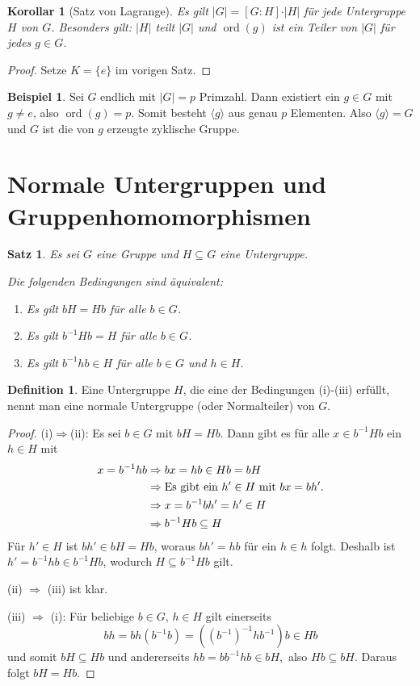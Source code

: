 \documentclass[12pt]{scrartcl} %
\DeclareMathOperator{\ord}{ord}
\newtheorem{thm}{Satz}
\newtheorem{kor}{Korollar}
\theoremstyle{definition}
\newtheorem*{defn}{Definition}
\newtheorem{ex}{Beispiel}
\theoremstyle{remark}
\begin{document}
\begin{kor}[Satz von Lagrange]
	Es gilt $\vert G\vert = [G:H]\cdot\vert H\vert$ für jede Untergruppe $H$ von $G$.
	Besonders gilt: $\vert H\vert$ teilt $\vert G\vert$ und $\ord(g)$ ist ein Teiler von $\vert G\vert$ für jedes $g\in G$.
\end{kor}

\begin{proof}
	Setze $K = \{e\}$ im vorigen Satz.
\end{proof}

\begin{ex}
	Sei $G$ endlich mit $\vert G\vert=p$ Primzahl.
	Dann existiert ein $g \in G$ mit $g \neq e$, also $\ord(g)=p$.
	Somit besteht $\langle g\rangle$ aus genau $p$ Elementen.
	Also $\langle g\rangle=G$ und $G$ ist die von $g$ erzeugte zyklische Gruppe.
\end{ex}

\section{Normale Untergruppen und Gruppenhomomorphismen}

\begin{thm}
	Es sei $G$ eine Gruppe und $H\subseteq G$ eine Untergruppe.

	Die folgenden Bedingungen sind äquivalent:
	\begin{enumerate}[label=(\roman*)]
	\item Es gilt $bH=Hb$ für alle $b\in G$.
	\item Es gilt $b^{-1}Hb=H$ für alle $b\in G$.
	\item Es gilt $b^{-1}hb \in H$ für alle $b\in G$ und $h\in H$.
	\end{enumerate}
\end{thm}

\begin{defn}
	Eine Untergruppe $H$, die eine der Bedingungen (i)-(iii) erfüllt, nennt man eine normale Untergruppe (oder Normalteiler) von $G$.
\end{defn}

\begin{proof}
	(i)$\Rightarrow$(ii):
	Es sei $b \in G$ mit $bH=Hb$.
	Dann gibt es für alle $x \in b^{-1}Hb$ ein \(h \in H\) mit
	\begin{align*}
		x=b^{-1}hb &\Rightarrow bx=hb \in Hb=bH\\
		&\Rightarrow \text{Es gibt ein \(h' \in H$ mit $bx=bh'\).}\\
		&\Rightarrow x=b^{-1}bh'=h'\in H\\
		&\Rightarrow b^{-1}Hb \subseteq H
	\end{align*}
	Für $h' \in H$ ist $bh' \in bH = Hb$, woraus $bh'=hb$ für ein $h \in h$ folgt.
	Deshalb ist $h'=b^{-1}hb \in b^{-1}Hb$, wodurch $H \subseteq b^{-1}Hb$ gilt.

	(ii) $\Rightarrow$ (iii) ist klar.

	(iii) $\Rightarrow$ (i):
	Für beliebige $b \in G$, $h\in H$ gilt einerseits
	\[bh=bh(b^{-1}b)=((b^{-1})^{-1}hb^{-1})b \in Hb\]
	und somit \(bH \subseteq Hb\) und andererseits \(hb=bb^{-1}hb \in bH,\) also \(Hb \subseteq bH\).
	Daraus folgt $bH=Hb$.
\end{proof}
\end{document}
